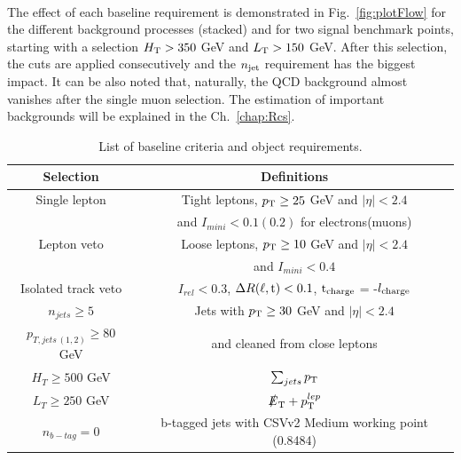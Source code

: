 \\
The effect of each baseline requirement is demonstrated in Fig.~\ref{fig:plotFlow} for the different background processes (stacked) and for two signal benchmark points, starting with a selection $H_{\rm T} > 350$ GeV and $L_{\rm T} > 150$ GeV. After this selection, the cuts are applied consecutively and the $n_{\rm jet}$ requirement has the biggest impact. It can be also noted that, naturally, the QCD background almost vanishes after the single muon selection. The estimation of important backgrounds will be explained in the Ch.~\ref{chap:Rcs}.
\renewcommand{\arraystretch}{1.5}
\begin{table}[ht]
\begin{center}
\caption{List of baseline criteria and object requirements.}\label{tab:CutSummary}
\begin{tabular}{|c|c|}\hline
Selection        & Definitions \\
\hline
\hline
Single lepton &Tight leptons, $p_{\rm T} \geq 25$ GeV and $|\eta| < 2.4$\\
                      & and $I_{mini}<0.1(0.2)$ for electrons(muons)\\\hline
Lepton veto & Loose leptons, $p_{\rm T} \geq 10$ GeV and $|\eta| < 2.4$ \\
		& and $I_{mini}<0.4$ \\\hline
Isolated track veto & $I_{rel}<0.3$, $\Delta R(\ell,{\rm t}) <0.1$, ${\rm t}_{\rm charge}$ = -${l}_{\rm charge}$  \\\hline
$n_{jets} \geq 5$ & Jets with $p_{\rm T} \geq 30$ GeV and $|\eta| < 2.4$ \\
\cline{1-1}
$p_{T,jets\,(1,2)} \geq 80$ GeV & and cleaned from close leptons \\\hline
$H_T \geq 500$ GeV & $\sum_{jets} p_{\rm T}$\\\hline
$L_T \geq 250$ GeV &  $\slashed{E}_{\rm T} + p_{\rm T}^{lep}$ \\\hline
$n_{b-tag} = 0$ & b-tagged jets with CSVv2 Medium working point (0.8484)\\\hline
\end{tabular}
\end{center}
\end{table}
\renewcommand{\arraystretch}{1}
